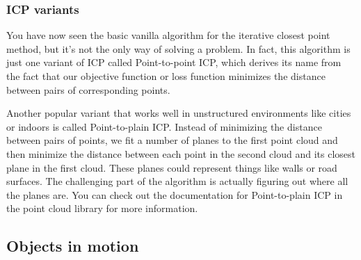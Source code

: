 \subsubsection{ICP variants}

You have now seen
the basic vanilla algorithm for the iterative
closest point method, but it's not the only way
of solving a problem. In fact, this algorithm is just one variant of ICP
called Point-to-point ICP, which derives its name from the fact that
our objective function or loss function
minimizes the distance between pairs of
corresponding points. 

Another popular variant that works well in unstructured
environments like cities or indoors is
called Point-to-plain ICP. Instead of minimizing
the distance between pairs of points, we fit a number of planes to the first point cloud and
then minimize the distance between each point in the second cloud and its closest plane
in the first cloud. These planes could
represent things like walls or road surfaces. The challenging part
of the algorithm is actually figuring out
where all the planes are. You can check out
the documentation for Point-to-plain ICP in the point cloud library
for more information. 

\subsection{Objects in motion}

